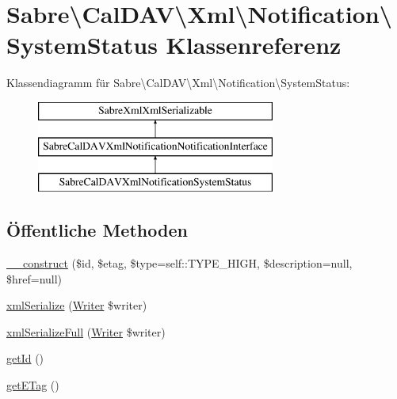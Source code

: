 \hypertarget{class_sabre_1_1_cal_d_a_v_1_1_xml_1_1_notification_1_1_system_status}{}\section{Sabre\textbackslash{}Cal\+D\+AV\textbackslash{}Xml\textbackslash{}Notification\textbackslash{}System\+Status Klassenreferenz}
\label{class_sabre_1_1_cal_d_a_v_1_1_xml_1_1_notification_1_1_system_status}
Klassendiagramm für Sabre\textbackslash{}Cal\+D\+AV\textbackslash{}Xml\textbackslash{}Notification\textbackslash{}System\+Status\+:\begin{figure}[H]
\begin{center}
\leavevmode
\includegraphics[height=3.000000cm]{class_sabre_1_1_cal_d_a_v_1_1_xml_1_1_notification_1_1_system_status}
\end{center}
\end{figure}
\subsection*{Öffentliche Methoden}
\begin{DoxyCompactItemize}
\item 
\mbox{\hyperlink{class_sabre_1_1_cal_d_a_v_1_1_xml_1_1_notification_1_1_system_status_a4a68e3958dea67caf3a44d0a9f250e7a}{\+\_\+\+\_\+construct}} (\$id, \$etag, \$type=self\+::\+T\+Y\+P\+E\+\_\+\+H\+I\+GH, \$description=null, \$href=null)
\item 
\mbox{\hyperlink{class_sabre_1_1_cal_d_a_v_1_1_xml_1_1_notification_1_1_system_status_a6f8d1c96033b9a803133844468042b96}{xml\+Serialize}} (\mbox{\hyperlink{class_sabre_1_1_xml_1_1_writer}{Writer}} \$writer)
\item 
\mbox{\hyperlink{class_sabre_1_1_cal_d_a_v_1_1_xml_1_1_notification_1_1_system_status_a8b76f8c950f79690bafb0d7bc7069e6e}{xml\+Serialize\+Full}} (\mbox{\hyperlink{class_sabre_1_1_xml_1_1_writer}{Writer}} \$writer)
\item 
\mbox{\hyperlink{class_sabre_1_1_cal_d_a_v_1_1_xml_1_1_notification_1_1_system_status_a2d0c5d8019711227b2e8f332249bf2db}{get\+Id}} ()
\item 
\mbox{\hyperlink{class_sabre_1_1_cal_d_a_v_1_1_xml_1_1_notification_1_1_system_status_a84961b05cc8106e15c3cab9d4c14f268}{get\+E\+Tag}} ()
\end{DoxyCompactItemize}
